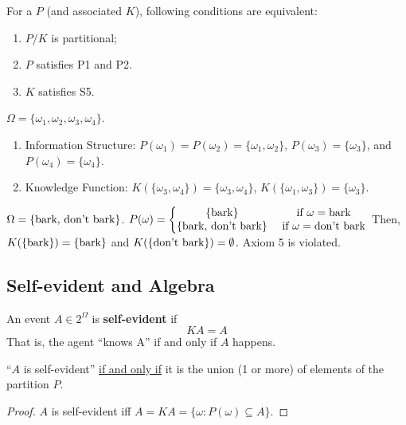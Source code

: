 \documentclass[11pt]{elegantbook_2}
\begin{document}
\begin{theorem}
    For a $P$ (and associated $K$), following conditions are equivalent:
    \begin{enumerate}[$\circ$]
        \item $P$/$K$ is partitional;
        \item $P$ satisfies P1 and P2.
        \item $K$ satisfies S5.
    \end{enumerate}
\end{theorem}

\begin{example}[ (Partitional)]
    $\Omega=\{\omega_1,\omega_2,\omega_3,\omega_4\}$.
    \begin{enumerate}
        \item Information Structure: $P(\omega_1)=P(\omega_2)=\{\omega_1,\omega_2\}$, $P(\omega_3)=\{\omega_3\}$, and $P(\omega_4)=\{\omega_4\}$.
        \item Knowledge Function: $K(\{\omega_3,\omega_4\})=\{\omega_3,\omega_4\}$, $K(\{\omega_1,\omega_3\})=\{\omega_3\}$.
    \end{enumerate}
\end{example}

\begin{example}
    $\Omega=\{\textnormal{bark, don't bark}\}$. $P(\omega)=\left\{\begin{matrix}
        \{\textnormal{bark}\} & \textnormal{ if }\omega=\textnormal{bark}\\
        \{\textnormal{bark, don't bark}\}& \textnormal{ if }\omega=\textnormal{don't bark}
    \end{matrix}\right.$ Then, $K(\{\textnormal{bark}\})=\{\textnormal{bark}\}$ and $K(\{\textnormal{don't bark}\})=\emptyset$.  Axiom 5 is violated.
\end{example}

\subsection{Self-evident and Algebra}
\begin{definition}
    An event $A \in 2^\Omega$ is \textbf{self-evident} if $$KA = A$$ That is, the agent ``knows A'' if and only if $A$ happens.
\end{definition}

\begin{proposition}
    ``$A$ is self-evident'' \underline{if and only if} it is the union (1 or more) of elements of the partition $P$.
\end{proposition}
\begin{proof}
    $A$ is self-evident iff $A=KA=\{\omega:P(\omega)\subseteq A\}$.
\end{proof}
\end{document}
